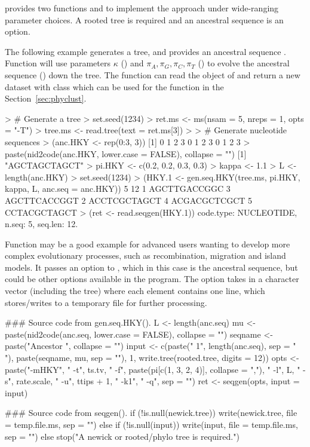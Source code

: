  provides two functions  and
 to implement the 
approach under wide-ranging parameter choices. A rooted tree is required and an
ancestral sequence is an option.

The following example generates a tree, and provides an ancestral
sequence . Function  will use
parameters $\kappa$ () and
$\pi_{A}, \pi_{G}, \pi_{C}, \pi_{T}$ ()
to evolve the ancestral sequence () down the tree.
The function  can read the object of
 and return a new dataset with class 
which can be used for the function  in the
Section~\ref{sec:phyclust}.
\begin{Code}
> # Generate a tree
> set.seed(1234)
> ret.ms <- ms(nsam = 5, nreps = 1, opts = "-T")
> tree.ms <- read.tree(text = ret.ms[3])
> 
> # Generate nucleotide sequences
> (anc.HKY <- rep(0:3, 3))
 [1] 0 1 2 3 0 1 2 3 0 1 2 3
> paste(nid2code(anc.HKY, lower.case = FALSE), collapse = "")
[1] "AGCTAGCTAGCT"
> pi.HKY <- c(0.2, 0.2, 0.3, 0.3)
> kappa <- 1.1
> L <- length(anc.HKY)
> set.seed(1234)
> (HKY.1 <- gen.seq.HKY(tree.ms, pi.HKY, kappa, L, anc.seq = anc.HKY))
 5 12
1         AGCTTGACCGGC
3         AGCTTCACCGGT
2         ACCTCGCTAGCT
4         ACGACGCTCGCT
5         CCTACGCTAGCT
> (ret <- read.seqgen(HKY.1))
code.type: NUCLEOTIDE, n.seq: 5, seq.len: 12.
\end{Code}

Function  may be a good example
for advanced users wanting to develop more complex evolutionary processes, such as recombination,
migration and island models. It passes an option  to
, which in this case is the ancestral sequence, but could be other
options available in the  program.
The option  takes in a character vector (including the tree)
where each element contains one line, which  stores/writes to
a temporary file for further processing.
\begin{Code}
### Source code from gen.seq.HKY().
        L <- length(anc.seq)
        mu <- paste(nid2code(anc.seq, lower.case = FALSE), collapse = "")
        seqname <- paste("Ancestor  ", collapse = "")
        input <- c(paste(" 1", length(anc.seq), sep = " "), paste(seqname, 
            mu, sep = ""), 1, write.tree(rooted.tree, digits = 12))
        opts <- paste("-mHKY", " -t", ts.tv, " -f", paste(pi[c(1, 
            3, 2, 4)], collapse = ","), " -l", L, " -s", rate.scale, 
            " -u", ttips + 1, " -k1", " -q", sep = "")
        ret <- seqgen(opts, input = input)

### Source code from seqgen().
        if (!is.null(newick.tree)) {
            write(newick.tree, file = temp.file.ms, sep = "")
        }
        else if (!is.null(input)) {
            write(input, file = temp.file.ms, sep = "\n")
        }
        else {
            stop("A newick or rooted/phylo tree is required.")
        }
\end{Code}

